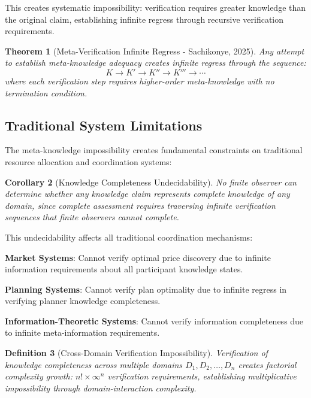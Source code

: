 \documentclass[12pt,a4paper]{article}
\newtheorem{theorem}{Theorem}[section]
\newtheorem{corollary}[theorem]{Corollary}
\newtheorem{definition}[theorem]{Definition}
\begin{document}
This creates systematic impossibility: verification requires greater knowledge than the original claim, establishing infinite regress through recursive verification requirements.

\begin{theorem}[Meta-Verification Infinite Regress - Sachikonye, 2025]  
Any attempt to establish meta-knowledge adequacy creates infinite regress through the sequence:
$$K \rightarrow K' \rightarrow K'' \rightarrow K''' \rightarrow \cdots$$
where each verification step requires higher-order meta-knowledge with no termination condition.
\end{theorem}

\subsection{Traditional System Limitations}

The meta-knowledge impossibility creates fundamental constraints on traditional resource allocation and coordination systems:

\begin{corollary}[Knowledge Completeness Undecidability]
No finite observer can determine whether any knowledge claim represents complete knowledge of any domain, since complete assessment requires traversing infinite verification sequences that finite observers cannot complete.
\end{corollary}

This undecidability affects all traditional coordination mechanisms:

\textbf{Market Systems}: Cannot verify optimal price discovery due to infinite information requirements about all participant knowledge states.

\textbf{Planning Systems}: Cannot verify plan optimality due to infinite regress in verifying planner knowledge completeness.

\textbf{Information-Theoretic Systems}: Cannot verify information completeness due to infinite meta-information requirements.

\begin{definition}[Cross-Domain Verification Impossibility]
Verification of knowledge completeness across multiple domains $D_1, D_2, \ldots, D_n$ creates factorial complexity growth: $n! \times \infty^n$ verification requirements, establishing multiplicative impossibility through domain-interaction complexity.
\end{definition}
\end{document}
